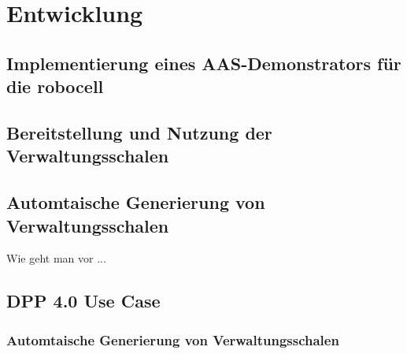 \section{Entwicklung}
\subsection{Implementierung eines AAS-Demonstrators für die robocell}
\subsection{Bereitstellung und Nutzung der Verwaltungsschalen}
\subsection{Automtaische Generierung von Verwaltungsschalen}
Wie geht man vor ...
\subsection{DPP 4.0 Use Case}
\subsubsection{Automtaische Generierung von Verwaltungsschalen}